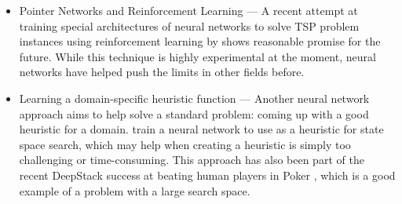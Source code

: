 {\begin{itemize}
\item Pointer Networks and Reinforcement Learning --- 
A recent attempt at training special architectures of neural networks to solve TSP problem instances using reinforcement learning by \citet{Bello2016} shows
reasonable promise for the future. While this technique is highly experimental at the moment,
neural networks have helped push the limits in other fields before.

\item Learning a domain-specific heuristic function --- Another neural network
approach aims to help solve a standard problem: coming up with a good heuristic for a domain. \citet{Chen2011}
train a neural network to use as a heuristic for state space search,
which may help when creating a heuristic is simply too challenging or time-consuming.
This approach has also been part of the recent DeepStack success at
beating human players in Poker \citep{Moravcik2017}, which is a good example of a problem with a large search space.
\end{itemize}



}